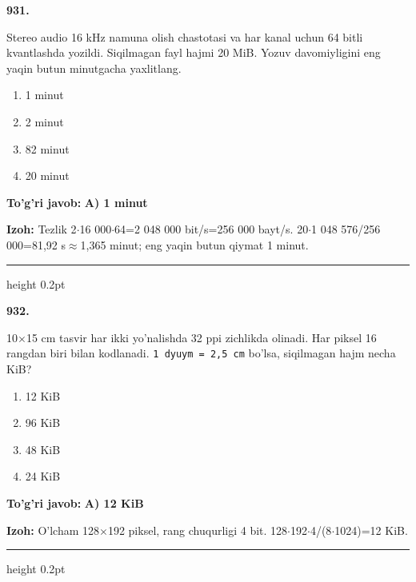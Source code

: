 \documentclass[10pt,a4paper,oneside]{article}
\begin{document}
\noindent\textbf{\color{ink}931.}
\par
Stereo audio 16 kHz namuna olish chastotasi va har kanal uchun 64 bitli kvantlashda yozildi. Siqilmagan fayl hajmi 20 MiB. Yozuv davomiyligini eng yaqin butun minutgacha yaxlitlang.
\begin{enumerate}[label=\Alph*),leftmargin=9mm]
\item 1 minut
\item 2 minut
\item 82 minut
\item 20 minut
\end{enumerate}
\begin{tcolorbox}[enhanced,breakable,colback=teal!4,colframe=teal!50!black,boxrule=0.5pt,arc=1.1mm,left=3mm,right=3mm,top=1.7mm,bottom=1.7mm,before skip=2mm,after skip=2mm]
\textbf{\color{teal}To'g'ri javob:} \textbf{A) 1 minut}
\par\smallskip
\textbf{Izoh:} Tezlik 2\ensuremath{\cdot}16 000\ensuremath{\cdot}64=2 048 000 bit/s=256 000 bayt/s. 20\ensuremath{\cdot}1 048 576/256 000=81,92 s\ensuremath{\approx}1,365 minut; eng yaqin butun qiymat 1 minut.
\end{tcolorbox}
\vspace{2mm}\hrule height 0.2pt \vspace{3mm}

\noindent\textbf{\color{ink}932.}
\par
10\ensuremath{\times}15 cm tasvir har ikki yo'nalishda 32 ppi zichlikda olinadi. Har piksel 16 rangdan biri bilan kodlanadi. \texttt{1 dyuym = 2,5 cm} bo'lsa, siqilmagan hajm necha KiB?
\begin{enumerate}[label=\Alph*),leftmargin=9mm]
\item 12 KiB
\item 96 KiB
\item 48 KiB
\item 24 KiB
\end{enumerate}
\begin{tcolorbox}[enhanced,breakable,colback=teal!4,colframe=teal!50!black,boxrule=0.5pt,arc=1.1mm,left=3mm,right=3mm,top=1.7mm,bottom=1.7mm,before skip=2mm,after skip=2mm]
\textbf{\color{teal}To'g'ri javob:} \textbf{A) 12 KiB}
\par\smallskip
\textbf{Izoh:} O'lcham 128\ensuremath{\times}192 piksel, rang chuqurligi 4 bit. 128\ensuremath{\cdot}192\ensuremath{\cdot}4/(8\ensuremath{\cdot}1024)=12 KiB.
\end{tcolorbox}
\vspace{2mm}\hrule height 0.2pt \vspace{3mm}
\end{document}
